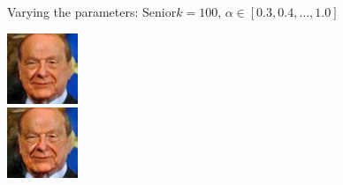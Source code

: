 \documentclass[11pt]{beamer}
\begin{document}
\begin{frame}{Varying the parameters: Senior}{$k=100$, $\alpha \in [0.3, 0.4, \dots, 1.0]$}
\begin{minipage}{81px}
	\end{minipage}%
	\begin{minipage}{81px}
		\includegraphics[width=80px]{../pictures/outputs/alpha_k/Senior/k100/Silvio_Berlusconi_0023_alpha-0.6_k-1002017-02-07_15-00-08.png}\\
		\includegraphics[width=80px]{../pictures/outputs/alpha_k/Senior/k100/Silvio_Berlusconi_0023_alpha-1.0_k-1002017-02-07_17-07-47.png}
	\end{minipage}
\end{frame}
\end{document}
